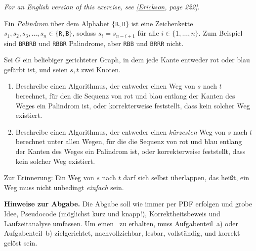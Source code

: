 \documentclass{uebung_cs}
\begin{document}
\textit{\footnotesize For an English version of this exercise, see [\href{https://jeffe.cs.illinois.edu/teaching/algorithms/book/Algorithms-JeffE.pdf}{Erickson}, page 222]}.

Ein \emph{Palindrom} über dem Alphabet $\{\texttt{R},\texttt{B}\}$ ist eine Zeichenkette $s_1,s_2,s_3,\dots,s_n\in\{\texttt{R},\texttt{B}\}$, sodass $s_i=s_{n-i+1}$ für alle $i\in\{1,\dots,n\}$. Zum Beispiel sind \texttt{BRBRB} und \texttt{RBBR} Palindrome, aber \texttt{RBB} und \texttt{BRRR} nicht.

Sei $G$ ein beliebiger gerichteter Graph, in dem jede Kante entweder rot oder blau gefärbt ist, und seien $s,t$ zwei Knoten.
\begin{enumerate}
    \item Beschreibe einen Algorithmus, der entweder einen Weg von $s$ nach $t$ berechnet, für den die Sequenz von rot und blau entlang der Kanten des Weges ein Palindrom ist, oder korrekterweise feststellt, dass kein solcher Weg existiert.
    \item Beschreibe einen Algorithmus, der entweder einen \emph{kürzesten} Weg von $s$ nach $t$ berechnet unter allen Wegen, für die die Sequenz von rot und blau entlang der Kanten des Weges ein Palindrom ist, oder korrekterweise feststellt, dass kein solcher Weg existiert.
\end{enumerate}
Zur Erinnerung: Ein Weg von $s$ nach $t$ darf sich selbst überlappen, das heißt, ein Weg muss nicht unbedingt \emph{einfach} sein.

\textbf{Hinweise zur Abgabe.}
Die Abgabe soll wie immer per PDF erfolgen und grobe Idee, Pseudocode (möglichst kurz und knapp!), Korrektheitsbeweis und Laufzeitanalyse umfassen. Um einen~ zu erhalten, muss Aufgabenteil~a) oder Aufgabenteil~b) zielgerichtet, nachvollziehbar, lesbar, vollständig, und korrekt gelöst sein.


\end{document}

